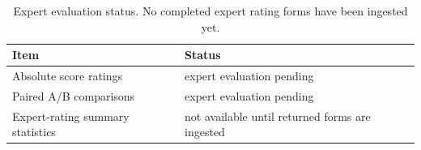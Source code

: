 \begin{table}[t]
\centering
\caption{Expert evaluation status. No completed expert rating forms have been ingested yet.}
\begin{tabular}{ll}
\toprule
Item & Status \\
\midrule
Absolute score ratings & expert evaluation pending \\
Paired A/B comparisons & expert evaluation pending \\
Expert-rating summary statistics & not available until returned forms are ingested \\
\bottomrule
\end{tabular}
\end{table}
